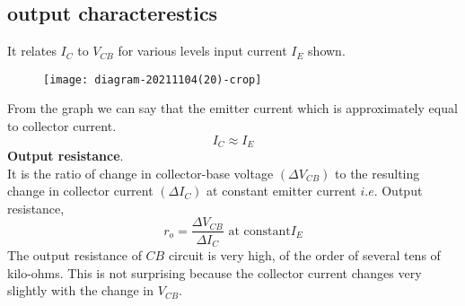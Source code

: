  \subsection{output characterestics}
 It relates $I_C$ to $V_{CB}$ for various levels input current $I_E$ shown.\\
\begin{figure}[H]
	\centering
	\texttt{[image: diagram-20211104(20)-crop]}
	\caption{}
	\label{}
\end{figure}
 From the graph we can say that the emitter current which is approximately equal to collector current.\\
 $$I_{C}\approx I_{E}$$
 \textbf{Output resistance}.\\
  It is the ratio of change in collector-base voltage $\left(\Delta V_{C B}\right)$ to the resulting change in collector current $\left(\Delta I_{C}\right)$ at constant emitter current $i . e$.
 Output resistance,\\
  $$r_{o}=\frac{\Delta V_{C B}}{\Delta I_{C}} \text{ at constant} I_{E}$$
 The output resistance of $C B$ circuit is very high, of the order of several tens of kilo-ohms. This is not surprising because the collector current changes very slightly with the change in $V_{C B}$.
